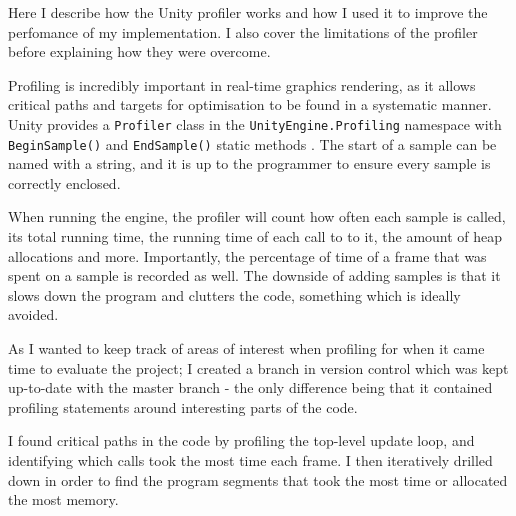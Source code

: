 \documentclass[12pt,a4paper,twoside]{report}
\begin{document}





Here I describe how the Unity profiler works and how I used it
to improve the perfomance of my implementation. I also cover the
limitations of the profiler before explaining how they were overcome.

Profiling is incredibly important in real-time graphics rendering, as it allows
critical paths and targets for optimisation to be found in a systematic manner.
Unity provides a \texttt{Profiler} class in the \texttt{UnityEngine.Profiling}
namespace with \texttt{BeginSample()} and \texttt{EndSample()} static methods
\cite{UnityProfiler}. The start of a sample can be named with a string, and it
is up to the programmer to ensure every sample is correctly enclosed.

When running the engine, the profiler will count how often each sample is
called, its total running time, the running time of each call to to it, the
amount of heap allocations and more. Importantly, the percentage of time of a
frame that was spent on a sample is recorded as well. The downside of adding
samples is that it slows down the program and clutters the code, something
which is ideally avoided.

As I wanted to keep track of areas of interest when profiling for when it came
time to evaluate the project; I created a branch in version control which was
kept up-to-date with the master branch - the only difference being that it
contained profiling statements around interesting parts of the code.

I found critical paths in the code by profiling the top-level update loop,
and identifying which calls took the most time each frame. I then iteratively
drilled down in order to find the program segments that took the most time or
allocated the most memory.
\end{document}
